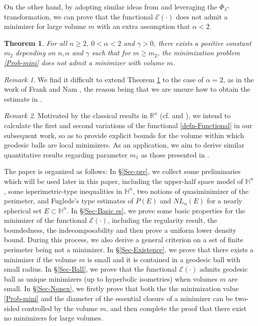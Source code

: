 \documentclass[11pt,reqno]{amsart}
\newtheorem{thm}{Theorem}[section]
\theoremstyle{definition}
\theoremstyle{remark}
\newtheorem{rem}{Remark}
\numberwithin{equation}{section}
\renewcommand{\(}{\left(}
\renewcommand{\)}{\right)}
\renewcommand{\-}{\overline}
\begin{document}
On the other hand, by adopting similar ideas from \cite{Knupfer-Muratov14} and leveraging the $\Phi_{\lambda}$-transformation, we can prove that the functional $\mathcal{E}(\cdot)$ does not admit a minimizer for large volume $m$ with an extra assumption that $\alpha<2$.
\begin{thm}\label{Thm-Nonexistence}
	For all $n\geq 2$, $0<\alpha<2$ and $\gamma>0$, there exists a positive constant $m_2$ depending on $n,\alpha$ and $\gamma$ such that for $m\geq m_2$, the minimization problem \eqref{Prob-mini} does not admit a minimizer with volume $m$.
\end{thm}
\begin{rem}
	We find it difficult to extend Theorem \ref{Thm-Nonexistence} to the case of $\alpha=2$, as in the work of Frank and Nam \cite{Frank-Nam21}, the reason being that we are unsure how to obtain the estimate in \cite[Lemma 7]{Frank-Nam21}.
\end{rem}
\begin{rem}
	Motivated by the classical results in $\mathbb{R}^n$ (cf. \cite[Theorem 2.9]{Bonacini-Cristoferi14} and \cite[Theorem 1.5]{Figalli15}), we intend to calculate the first and second variations of the functional \eqref{defn-Functional} in our subsequent work, so as to provide explicit bounds for the volume within which geodesic balls are local minimizers. As an application, we aim to derive similar quantitative results regarding parameter $m_1$ as those presented in \cite{Chodosh-Ruohomiemi25}.
\end{rem}
The paper is organized as follows: In \S\ref{Sec-pre}, we collect some preliminaries which will be used later in this paper, including the upper-half space model of $\mathbb{H}^n$, some isperimetric-type inequalities in $\mathbb{H}^n$, two notions of quasiminimizer of the perimeter, and Fuglede’s type estimates of $P(E)$ and $NL_{\alpha}(E)$ for a nearly spherical set $E\subset\mathbb{H}^n$. In \S\ref{Sec-Basic es}, we prove some basic properties for the minimizer of the functional $\mathcal{E}(\cdot)$, including the regularity result, the boundedness, the indecomposability and then prove a uniform lower density bound. During this process, we also derive a general criterion on a set of finite perimeter being not a minimizer. In \S\ref{Sec-Existence}, we prove that there exists a minimizer if the volume $m$ is small and it is contained in a geodesic ball with small radius. In \S\ref{Sec-Ball}, we prove that the functional $\mathcal{E}(\cdot)$ admits geodesic ball as unique minimizers (up to hyperbolic isometries) when volumes $m$ are small. In \S\ref{Sec-Nonex}, we firstly prove that both the the minimization value \eqref{Prob-mini} and the diameter of the essential closure of a minimizer can be two-sided controlled by the volume $m$, and then complete the proof that there exist no minimizers for large volumes.
\end{document}
